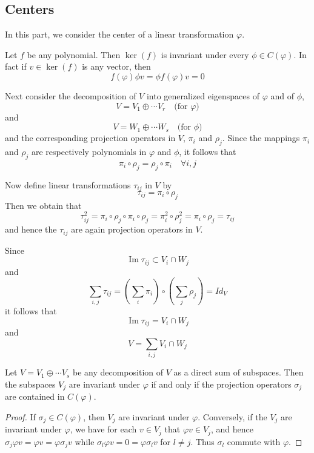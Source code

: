 \subsection{Centers}
In this part, we consider the center of a linear transformation $\varphi$.\par
Let $f$ be any polynomial. Then $\ker(f)$ is invariant under every $\phi\in C(\varphi)$. In fact if $v\in \ker(f)$ is any vector, then 
\[f(\varphi)\phi v=\phi f(\varphi)v=0\]\par
Next consider the decomposition of $V$ into generalized eigenspaces of $\varphi$ and of $\phi$, 
\[V=V_1\oplus\cdots V_r\quad \text{(for }\varphi\text{)}\]
and
\[V=W_1\oplus\cdots W_s\quad \text{(for }\phi\text{)}\]
and the corresponding projection operators in $V$, $\pi_i$ and $\rho_j$. Since the mappings $\pi_i$ and $\rho_j$ are respectively polynomials in $\varphi$ and $\phi$, it follows that 
\[\pi_i\circ \rho_j=\rho_j\circ\pi_i\quad \forall i,j\]\par
Now define linear transformations $\tau_{ij}$ in $V$ by \[\tau_{ij}=\pi_i\circ\rho_j\]
Then we obtain that \[\tau_{ij}^2=\pi_i\circ \rho_j\circ\pi_i\circ \rho_j=\pi_i^2\circ\rho_j^2=\pi_i\circ\rho_j=\tau_{ij}\]
and hence the $\tau_{ij}$ are again projection operators in $V$.\par
Since \[\operatorname{Im} \tau_{ij}\subset V_i\cap W_j\]
and \[\sum_{i,j}\tau_{ij}=(\sum_i \pi_i)\circ(\sum_j\rho_j)=Id_V\]
it follows that \[ \operatorname{Im}\tau_{ij}=V_i\cap W_j\]
and \[V=\sum_{i,j} V_i\cap W_j\]
\begin{theorem}
Let $V=V_1\oplus\cdots V_s$ be any decomposition of $V$ as a direct sum of subspaces. Then the subspaces $V_j$ are invariant under $\varphi$ if and only if the projection operators $\sigma_j$ are contained in $C(\varphi)$.
\end{theorem}
\begin{proof}
If $\sigma_j\in C(\varphi)$, then $V_j$ are invariant under $\varphi$. Conversely, if the $V_j$ are invariant under $\varphi$, we have for each $v\in V_j$ that $\varphi v\in V_j$, and hence $\sigma_j \varphi v=\varphi v=\varphi \sigma_j v$ while $\sigma_l\varphi v=0=\varphi \sigma_l v$ for $l\ne j$. Thus $\sigma_l$ commute with $\varphi$.
\end{proof}
\begin{theorem}

\end{theorem}



